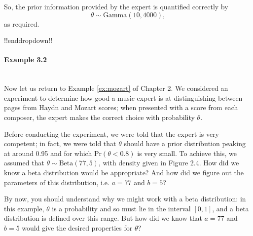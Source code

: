     So, the prior information provided by the expert is quantified correctly by $$\theta\sim\mathrm{Gamma}(10, 4000),$$ as required.

!!enddropdown!!




\paragraph{Example 3.2}{~\\
Now let us return to Example \ref{ex:mozart} of Chapter 2.  We considered an experiment to determine how good a music expert is at distinguishing between pages from Haydn and Mozart scores; when presented with a score from each composer, the expert makes the correct choice with probability $\theta$.  

Before conducting the experiment, we were told that the expert is very competent; in fact, we were told that $\theta$ should have a prior distribution peaking at around 0.95 and for which $\text{Pr}(\theta<0.8)$ is very small.  To achieve this, we assumed that $\theta \sim \mathrm{Beta}(77,5)$, with density given in Figure 2.4.  How did we know a beta distribution would be appropriate?  And how did we figure out the parameters of this distribution, i.e. $a=77$ and $b=5$?  

By now, you should understand why we might work with a beta distribution: in this example, $\theta$ is a probability and so must lie in the interval $[0,1]$, and a beta distribution is defined over this range.  But how did we know that $a=77$ and $b=5$ would give the desired properties for $\theta$?  

}
